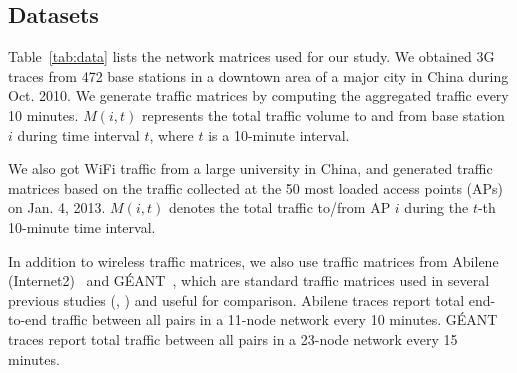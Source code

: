 \subsection{Datasets}
\label{ssec:data}

Table~\ref{tab:data} lists the network matrices used for our
study. 
We obtained 3G traces from 472 base stations in a downtown area of a major city
in China during Oct. 2010. 
We generate traffic matrices by computing the aggregated traffic every 10
minutes. $M(i,t)$ represents the total traffic volume to and from base station
$i$ during time interval $t$, where $t$ is a 10-minute interval.

We also got WiFi traffic from a large university in China, and
generated traffic matrices based on the traffic collected at the 50 most
loaded access points (APs) on Jan. 4, 2013. $M(i, t)$ denotes
the total traffic to/from AP $i$ during the $t$-th 10-minute
time interval. 

In addition to wireless traffic matrices, we also
use traffic matrices from Abilene (Internet2)~\cite{abilene}
and G\'{E}ANT~\cite{uhlig06:_provid}, which are standard traffic matrices
used in several previous studies (\eg,
\cite{PCA2,lakhina04:_pca,anomography,zhang09sensing}) and useful for
comparison. Abilene traces report total end-to-end traffic between all pairs
in a 11-node network every 10 minutes. G\'{E}ANT traces report total traffic
between all pairs in a 23-node network every 15 minutes. 

